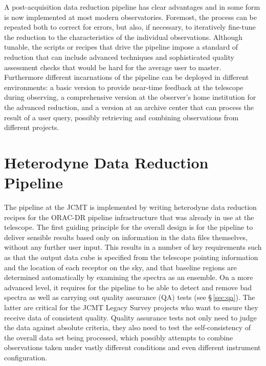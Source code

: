 \documentclass[final,authoryear,5p,times,twocolumn]{elsarticle}
\begin{document}
A post-acquisition data reduction pipeline has clear advantages and in
some form is now implemented at most modern observatories. Foremost,
the process can be repeated both to correct for errors, but also, if
necessary, to iteratively fine-tune the reduction to the
characteristics of the individual observations. Although tunable, the
scripts or recipes that drive the pipeline impose a standard of
reduction that can include advanced techniques and sophisticated
quality assessment checks that would be hard for the average user to
master. Furthermore different incarnations of the pipeline can be
deployed in different environments: a basic version to provide
near-time feedback at the telescope during observing, a comprehensive
version at the observer's home institution for the advanced reduction,
and a version at an archive center that can process the result of a
user query, possibly retrieving and combining observations from
different projects.


\section{Heterodyne Data Reduction Pipeline}

The pipeline at the JCMT is implemented by writing heterodyne data
reduction recipes for the ORAC-DR pipeline infrastructure
\citep[][]{2011tfa..confE..42J,2008AN....329..295C} that was already in
use at the telescope. The first guiding principle for the overall
design is for the pipeline to deliver sensible results based only on
information in the data files themselves, without any further user
input. This results in a number of key requirements such as that the
output data cube is specified from the telescope pointing information
and the location of each receptor on the sky, and that baseline
regions are determined automatically by examining the spectra as an
ensemble. On a more advanced level, it requires for the pipeline to be
able to detect and remove bad spectra as well as carrying out quality
assurance (QA) tests (see \S\,\ref{sec:qa}). The latter are critical
for the JCMT Legacy Survey projects
\citep{2007PASP..119..855W,2009ApJ...693.1736W,2007PASP..119..102P}
who want to ensure they receive data of consistent quality.  Quality
assurance tests not only need to judge the data against absolute
criteria, they also need to test the self-consistency of the overall
data set being processed, which possibly attempts to combine
observations taken under vastly different conditions and even
different instrument configuration.
\end{document}
